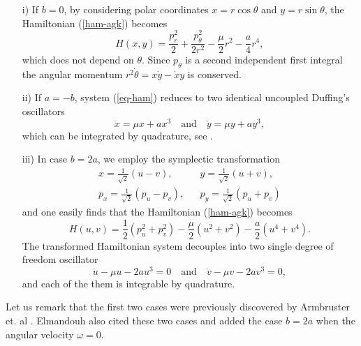 \documentclass[final]{siamart0516}
\begin{document}
\begin{enumerate}
\item[i)] If $b=0$, by considering polar coordinates $x=r\cos\theta$ and $y=r\sin\theta$, the Hamiltonian (\ref{ham-agk}) becomes
\begin{equation}\label{ham-b0}
H(x,y)= \frac{p_r^2}{2}+\frac{p_\theta^2}{2r^2} -\frac{\mu}{2}r^2-\frac{a}{4} r^4,
\end{equation}
which does not depend on $\theta$. Since $p_\theta$ is a second independent first integral
the angular momentum $r^2\dot{\theta} = x\dot{y}-\dot{x}y$ is conserved.
%
\item[ii)] If $a=-b$, system (\ref{eq-ham}) reduces to two identical uncoupled Duffing's oscillators
$$\ddot{x} =  \mu x+ax^3 \quad \mbox{and} \quad
\ddot{y}  = \mu y+ay^3, $$
which can be integrated by quadrature, see \cite{wigg}.
\item[iii)] In case  $b=2a$, we employ the symplectic transformation
\begin{eqnarray*}
x=\frac{1}{\sqrt{2}}(u-v), &&  y=\frac{1}{\sqrt{2}}(u+v),\\
p_x=\frac{1}{\sqrt{2}}(p_u-p_v), && p_y=\frac{1}{\sqrt{2}}(p_u+p_v)
\end{eqnarray*}
and one  easily finds  that the Hamiltonian  (\ref{ham-agk}) becomes
\begin{equation}\label{ham-b2a}
H(u,v)=\frac{1}{2}(p_u^2+p_v^2)-\frac{\mu}{2}(u^2+v^2)-\frac{a}{2}(u^4+v^4).
\end{equation}
The transformed Hamiltonian  system decouples into two single degree of freedom oscillator $$
\ddot{u}-\mu u - 2a u^3=0 \quad \mbox{and} \quad   \ddot{v}-\mu v -2av^3=0,
$$
and each of the them  is integrable by quadrature.
\end{enumerate}

Let us remark that the first two cases were previously discovered by Armbruster et. al \cite{agk}. 
Elmandouh \cite{elmandouh}  also cited these two cases and added the case $b=2a$ when the  angular velocity $\omega=0$. 
\end{document}
